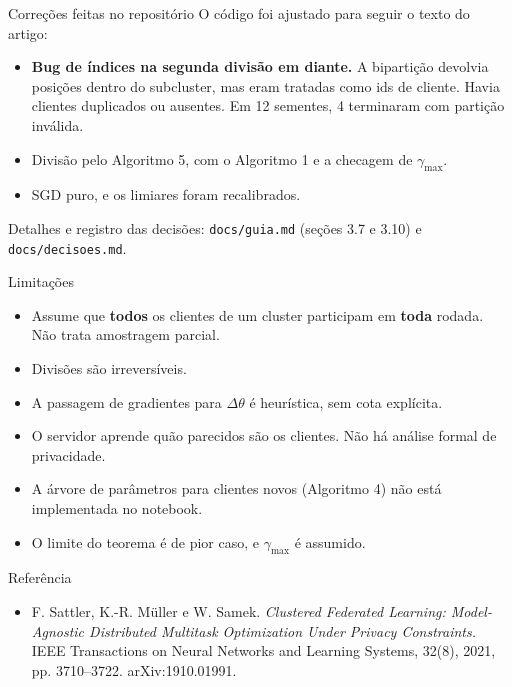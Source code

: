 \documentclass[aspectratio=169]{beamer}
\begin{document}
\begin{frame}{Correções feitas no repositório}
  O código foi ajustado para seguir o texto do artigo:
  \begin{itemize}
    \item \textbf{Bug de índices na segunda divisão em diante.} A bipartição devolvia posições
      dentro do subcluster, mas eram tratadas como ids de cliente. Havia clientes duplicados ou
      ausentes. Em 12 sementes, 4 terminaram com partição inválida.
    \item Divisão pelo Algoritmo 5, com o Algoritmo 1 e a checagem de $\gamma_{\max}$.
    \item SGD puro, e os limiares foram recalibrados.
  \end{itemize}
  \vspace{0.4em}
  \small Detalhes e registro das decisões: \texttt{docs/guia.md} (seções 3.7 e 3.10) e \texttt{docs/decisoes.md}.
\end{frame}

\begin{frame}{Limitações}
  \begin{itemize}
    \item Assume que \textbf{todos} os clientes de um cluster participam em \textbf{toda} rodada.
      Não trata amostragem parcial.
    \item Divisões são irreversíveis.
    \item A passagem de gradientes para $\Delta\theta$ é heurística, sem cota explícita.
    \item O servidor aprende quão parecidos são os clientes. Não há análise formal de privacidade.
    \item A árvore de parâmetros para clientes novos (Algoritmo 4) não está implementada no notebook.
    \item O limite do teorema é de pior caso, e $\gamma_{\max}$ é assumido.
  \end{itemize}
\end{frame}

\begin{frame}{Referência}
  \begin{itemize}
    \item F. Sattler, K.-R. Müller e W. Samek. \emph{Clustered Federated Learning:
      Model-Agnostic Distributed Multitask Optimization Under Privacy Constraints.}
      IEEE Transactions on Neural Networks and Learning Systems, 32(8), 2021, pp. 3710--3722.
      arXiv:1910.01991.
  \end{itemize}
\end{frame}
\end{document}
